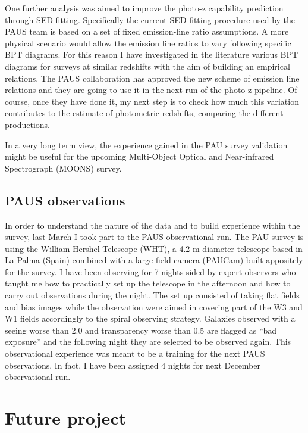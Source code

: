 \documentclass[11pt]{article}
\begin{document}
One further analysis was aimed to improve the photo-z capability prediction through SED fitting. Specifically the current SED fitting procedure used by the PAUS team is based on a set of fixed emission-line ratio assumptions. A more physical scenario would allow the emission line ratios to vary following specific BPT diagrams. For this reason I have investigated in the literature various BPT diagrams for surveys at similar redshifts with the aim of building an empirical relations. The PAUS collaboration has approved the new scheme of emission line relations and they are going to use it in the next run of the photo-z pipeline. Of course, once they have done it, my next step is to check how much this variation contributes to the estimate of photometric redshifts, comparing the different productions.

In a very long term view, the experience gained in the PAU survey validation might be useful for the upcoming Multi-Object Optical and Near-infrared Spectrograph (MOONS) survey.


\subsection{PAUS observations}
\label{sub:PAU_obs}
In order to understand the nature of the data and to build experience within the survey, last March I took part to the PAUS observational run. The PAU survey is using the William Hershel Telescope (WHT), a 4.2 m diameter telescope based in La Palma (Spain) combined with a large field camera (PAUCam) built appositely for the survey. I have been observing for 7 nights sided by expert observers who taught me how to practically set up the telescope in the afternoon and how to carry out observations during the night. The set up consisted of taking flat fields and bias images while the observation were aimed in covering part of the W3 and W1 fields accordingly to the spiral observing strategy. Galaxies observed with a seeing worse than 2.0 and transparency worse than 0.5 are flagged as ``bad exposure'' and the following night they are selected to be observed again. This observational experience was meant to be a training for the next PAUS observations. In fact, I have been assigned 4 nights for next December observational run.  

\section{Future project}
\end{document}
